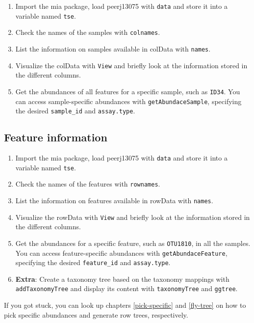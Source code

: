 \documentclass[
]{book}
\providecommand{\tightlist}{%
  \setlength{\itemsep}{0pt}\setlength{\parskip}{0pt}}
\begin{document}
\begin{enumerate}
\def\labelenumi{\arabic{enumi}.}
\tightlist
\item
  Import the mia package, load peerj13075 with \texttt{data} and store it into a
  variable named \texttt{tse}.
\item
  Check the names of the samples with \texttt{colnames}.
\item
  List the information on samples available in colData with \texttt{names}.
\item
  Visualize the colData with \texttt{View} and briefly look at the information stored
  in the different columns.
\item
  Get the abundances of all features for a specific sample, such as \texttt{ID34}. You
  can access sample-specific abundances with \texttt{getAbundaceSample}, specifying the
  desired \texttt{sample\_id} and \texttt{assay.type}.
\end{enumerate}

\hypertarget{feature-information}{%
\subsection{Feature information}\label{feature-information}}

\begin{enumerate}
\def\labelenumi{\arabic{enumi}.}
\tightlist
\item
  Import the mia package, load peerj13075 with \texttt{data} and store it into a
  variable named \texttt{tse}.
\item
  Check the names of the features with \texttt{rownames}.
\item
  List the information on features available in rowData with \texttt{names}.
\item
  Visualize the rowData with \texttt{View} and briefly look at the information stored
  in the different columns.
\item
  Get the abundances for a specific feature, such as \texttt{OTU1810}, in all the
  samples. You can access feature-specific abundances with \texttt{getAbundaceFeature},
  specifying the desired \texttt{feature\_id} and \texttt{assay.type}.
\item
  \textbf{Extra}: Create a taxonomy tree based on the taxonomy mappings with
  \texttt{addTaxonomyTree} and display its content with \texttt{taxonomyTree} and \texttt{ggtree}.
\end{enumerate}

If you got stuck, you can look up chapters \ref{pick-specific} and \ref{fly-tree}
on how to pick specific abundances and generate row trees, respectively.
\end{document}
